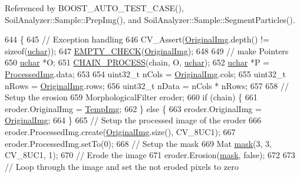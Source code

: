 Referenced by B\+O\+O\+S\+T\+\_\+\+A\+U\+T\+O\+\_\+\+T\+E\+S\+T\+\_\+\+C\+A\+S\+E(), Soil\+Analyzer\+::\+Sample\+::\+Prep\+Img(), and Soil\+Analyzer\+::\+Sample\+::\+Segment\+Particles().


\begin{DoxyCode}
644                                         \{
645   \textcolor{comment}{// Exception handling}
646   CV\_Assert(\hyperlink{class_vision_1_1_image_processing_a77c370dab270158a4e9c634e2d3f48e7}{OriginalImg}.depth() != \textcolor{keyword}{sizeof}(\hyperlink{_soil_math_types_8h_a65f85814a8290f9797005d3b28e7e5fc}{uchar}));
647   \hyperlink{_image_processing_8h_a27c4e53b88a0f9f2c097add555131056}{EMPTY\_CHECK}(\hyperlink{class_vision_1_1_image_processing_a77c370dab270158a4e9c634e2d3f48e7}{OriginalImg});
648 
649   \textcolor{comment}{// make Pointers}
650   \hyperlink{_soil_math_types_8h_a65f85814a8290f9797005d3b28e7e5fc}{uchar} *O;
651   \hyperlink{_image_processing_8h_a6e6f0183cb53c76ef458d4fd34e07bcd}{CHAIN\_PROCESS}(chain, O, \hyperlink{_soil_math_types_8h_a65f85814a8290f9797005d3b28e7e5fc}{uchar});
652   \hyperlink{_soil_math_types_8h_a65f85814a8290f9797005d3b28e7e5fc}{uchar} *P = \hyperlink{class_vision_1_1_image_processing_aa7d65742882cd1b2a1e4e9cb68809211}{ProcessedImg}.data;
653 
654   uint32\_t nCols = \hyperlink{class_vision_1_1_image_processing_a77c370dab270158a4e9c634e2d3f48e7}{OriginalImg}.cols;
655   uint32\_t nRows = \hyperlink{class_vision_1_1_image_processing_a77c370dab270158a4e9c634e2d3f48e7}{OriginalImg}.rows;
656   uint32\_t nData = nCols * nRows;
657 
658   \textcolor{comment}{// Setup the erosion}
659   MorphologicalFilter eroder;
660   \textcolor{keywordflow}{if} (chain) \{
661     eroder.OriginalImg = \hyperlink{class_vision_1_1_image_processing_a5371ad8d6f7aac9d43ee5c902ade7435}{TempImg};
662   \} \textcolor{keywordflow}{else} \{
663     eroder.OriginalImg = \hyperlink{class_vision_1_1_image_processing_a77c370dab270158a4e9c634e2d3f48e7}{OriginalImg};
664   \}
665   \textcolor{comment}{// Setup the processed image of the eroder}
666   eroder.ProcessedImg.create(\hyperlink{class_vision_1_1_image_processing_a77c370dab270158a4e9c634e2d3f48e7}{OriginalImg}.size(), CV\_8UC1);
667   eroder.ProcessedImg.setTo(0);
668   \textcolor{comment}{// Setup the mask}
669   Mat \hyperlink{_gen_blob_8m_a5d76cc2129e79ba1941d2cc2f53b9e8e}{mask}(3, 3, CV\_8UC1, 1);
670   \textcolor{comment}{// Erode the image}
671   eroder.Erosion(\hyperlink{_gen_blob_8m_a5d76cc2129e79ba1941d2cc2f53b9e8e}{mask}, \textcolor{keyword}{false});
672 
673   \textcolor{comment}{// Loop through the image and set the not eroded pixels to zero}

\end{DoxyCode}

